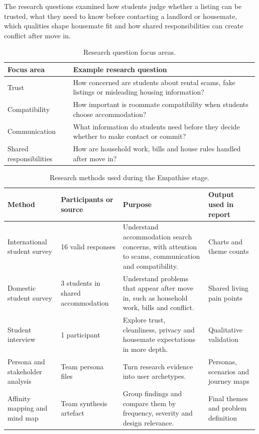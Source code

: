 \documentclass[11pt,a4paper]{article}
\begin{document}
The research questions examined how students judge whether a listing can be trusted, what they need to know before contacting a landlord or housemate, which qualities shape housemate fit and how shared responsibilities can create conflict after move in.

\begin{table}[H]
    \centering
    \small
    \caption{Research question focus areas.}
    \begin{tabularx}{\textwidth}{@{}L{3.2cm} Y@{}}
        \toprule
        Focus area & Example research question\\
        \midrule
        Trust & How concerned are students about rental scams, fake listings or misleading housing information?\\
        Compatibility & How important is roommate compatibility when students choose accommodation?\\
        Communication & What information do students need before they decide whether to make contact or commit?\\
        Shared responsibilities & How are household work, bills and house rules handled after move in?\\
        \bottomrule
    \end{tabularx}
    \label{tabresearchquestions}
\end{table}

\begin{table}[H]
    \centering
    \small
    \caption{Research methods used during the Empathise stage.}
    \begin{tabularx}{\textwidth}{@{}L{3.0cm} L{3.3cm} Y Y@{}}
        \toprule
        Method & Participants or source & Purpose & Output used in report\\
        \midrule
        International student survey & 16 valid responses & Understand accommodation search concerns, with attention to scams, communication and compatibility. & Charts and theme counts\\
        Domestic student survey & 3 students in shared accommodation & Understand problems that appear after move in, such as household work, bills and conflict. & Shared living pain points\\
        Student interview & 1 participant & Explore trust, cleanliness, privacy and housemate expectations in more depth. & Qualitative validation\\
        Persona and stakeholder analysis & Team persona files & Turn research evidence into user archetypes. & Personas, scenarios and journey maps\\
        Affinity mapping and mind map & Team synthesis artefact & Group findings and compare them by frequency, severity and design relevance. & Final themes and problem definition\\
        \bottomrule
    \end{tabularx}
    \label{tabmethods}
\end{table}
\end{document}
